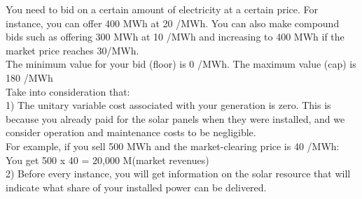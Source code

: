 \documentclass[3p]{elsarticle} %
\begin{document}
You need to bid on a certain amount of electricity at a certain price. For instance, you can offer 400 MWh at 20 \EUR/MWh. You can also make compound bids such as offering 300 MWh at 10 \EUR/MWh and increasing to 400 MWh if the market price reaches 30\EUR/MWh. \\

The minimum value for your bid (floor) is 0 \EUR/MWh. The maximum value (cap) is 180 \EUR/MWh \\

Take into consideration that: \\

1)	The unitary variable cost associated with your generation is zero. This is because you already paid for the solar panels when they were installed, and we consider operation and maintenance costs to be negligible. \\

For example, if you sell 500 MWh and the market-clearing price is 40 \EUR/MWh:\\
You get 500 x 40 = 20,000 M\EUR (market revenues)\\

2)	Before every instance, you will get information on the solar resource that will indicate what share of your installed power can be delivered.
\end{document}
